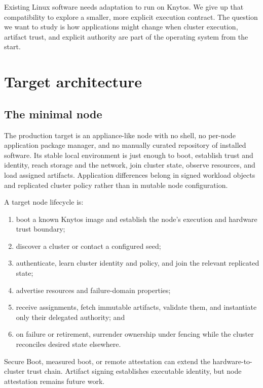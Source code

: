 Existing Linux software needs adaptation to run on Knytos. We give up
that compatibility to explore a smaller, more explicit execution contract.
The question we want to study is how applications might change when cluster
execution, artifact trust, and explicit authority are part of the operating
system from the start.

\section{Target architecture}

\subsection{The minimal node}

The production target is an appliance-like node with no shell, no per-node
application package manager, and no manually curated repository of installed
software. Its stable local environment is just enough to boot, establish
trust and identity, reach storage and the network, join cluster state,
observe resources, and load assigned artifacts. Application differences
belong in signed workload objects and replicated cluster policy rather than
in mutable node configuration.

A target node lifecycle is:

\begin{enumerate}
    \item boot a known Knytos image and establish the node's execution
        and hardware trust boundary;
    \item discover a cluster or contact a configured seed;
    \item authenticate, learn cluster identity and policy, and join the
        relevant replicated state;
    \item advertise resources and failure-domain properties;
    \item receive assignments, fetch immutable artifacts, validate them, and
        instantiate only their delegated authority; and
    \item on failure or retirement, surrender ownership under fencing while
        the cluster reconciles desired state elsewhere.
\end{enumerate}

Secure Boot, measured boot, or remote attestation can extend the
hardware-to-cluster trust chain. Artifact signing establishes executable
identity, but node attestation remains future work.

